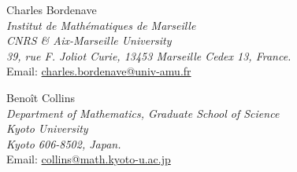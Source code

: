 \documentclass[11pt]{article}
\newcommand{\1}{1\!\!{\sf I}}
\begin{document}



\vline

\noindent 
Charles Bordenave \\
{\em Institut de Math\'ematiques de Marseille \\
CNRS \& Aix-Marseille University \\
39, rue F. Joliot Curie, 13453 Marseille Cedex 13, France.} \\
Email: \href{mailto:charles.bordenave@univ-amu.fr}{charles.bordenave@univ-amu.fr}

\vline

\noindent
Beno\^it Collins \\
{\em Department of Mathematics, Graduate School of Science \\
Kyoto University \\
 Kyoto 606-8502, Japan.} \\
Email: \href{mailto:collins@math.kyoto-u.ac.jp}{collins@math.kyoto-u.ac.jp}
\end{document}
